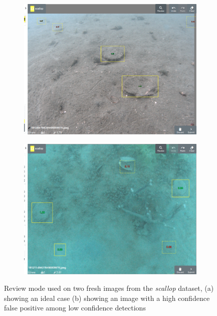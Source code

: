 \begin{figure}[h]
\centering
\begin{subfigure}[t]{0.5\linewidth}
  \includegraphics[width=1.0\linewidth]{figures/annotation/scallop/review_mode.png}
  \caption{}
\end{subfigure}%
\begin{subfigure}[t]{0.5\linewidth}
  \includegraphics[width=1.0\linewidth]{figures/annotation/scallop/false_positive.png}
  \caption{}
\end{subfigure}%
\caption{Review mode used on two fresh images from the \emph{scallop} dataset, (a) showing an ideal case (b) showing an image with a high confidence false positive among low confidence detections}
\label {fig:scallop_review}
\end{figure}



